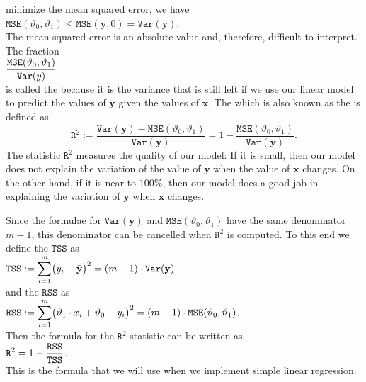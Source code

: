 minimize the mean squared error, we have
\\[0.2cm]
\hspace*{1.3cm}
$\mathtt{MSE}(\vartheta_0, \vartheta_1) \leq \mathtt{MSE}(\bar{\mathbf{y}}, 0) = \mathtt{Var}(\mathbf{y})$.
\\[0.2cm]
The mean squared error is an absolute value and, therefore, difficult to interpret.  The fraction
\\[0.2cm]
\hspace*{1.3cm}
$\displaystyle \frac{\mathtt{MSE}(\vartheta_0, \vartheta_1)}{\mathtt{Var}(y)}$
\\[0.2cm]
is called the  
because it is the variance that is still
left if we use our linear model to predict the values of $\mathbf{y}$ given the values of $\mathbf{x}$.  The
 
which is also known as the   is defined as 
\begin{equation}
  \label{eq:Rsquare}
  \mathtt{R}^2 := \frac{\mathtt{Var}(\mathbf{y}) - \mathtt{MSE}(\vartheta_0, \vartheta_1)}{\mathtt{Var}(\mathbf{y})} 
                = 1 - \frac{\mathtt{MSE}(\vartheta_0, \vartheta_1)}{\mathtt{Var}(\mathbf{y})}.
\end{equation}
The statistic $\mathtt{R}^2$ measures the quality of our
model: If it is small, then our model does not explain the variation of the value of $\mathbf{y}$ when the value of $\mathbf{x}$
changes.  On the other hand, if it is near to $100\%$, then our model does a good job in explaining the 
variation of $\mathbf{y}$ when $\mathbf{x}$ changes.

Since the formulae for $\mathtt{Var}(\mathbf{y})$ and $\mathtt{MSE}(\vartheta_0, \vartheta_1)$ have the same
denominator $m-1$, this denominator can be cancelled when $\mathtt{R}^2$ is computed.  To this
end we define the  $\mathtt{TSS}$   as
\\[0.2cm]
\hspace*{1.3cm}
$\displaystyle\mathtt{TSS} := \sum\limits_{i=1}^m \bigl(y_i - \bar{\mathbf{y}}\bigr)^2 = (m-1) \cdot \mathtt{Var}(\mathbf{y})$
\\[0.2cm]
and the   $\mathtt{RSS}$  as
\\[0.2cm]
\hspace*{1.3cm}
$\displaystyle\mathtt{RSS} := \sum\limits_{i=1}^m \bigl(\vartheta_1 \cdot x_i + \vartheta_0 - y_i\bigr)^2
                  = (m-1) \cdot \mathtt{MSE}(\vartheta_0, \vartheta_1)
$.
\\[0.2cm]
Then the formula for the $\mathtt{R}^2$ statistic can be written as
\\[0.2cm]
\hspace*{1.3cm}
$\displaystyle \mathtt{R}^2 = 1 - \frac{\mathtt{RSS}}{\mathtt{TSS}}$.
\\[0.2cm]
This is the formula that we will use when we implement simple linear regression.

